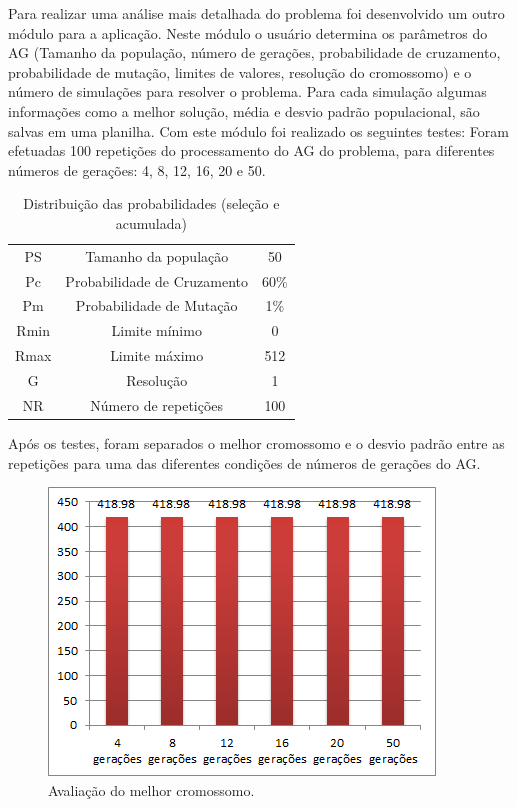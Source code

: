 \documentclass[twoside]{article}
\begin{document}
\begin{multicols}{2}
Para realizar uma análise mais detalhada do problema foi desenvolvido um outro módulo para a aplicação. Neste módulo o usuário determina os parâmetros do AG (Tamanho da população, número de gerações, probabilidade de cruzamento, probabilidade de mutação, limites de valores, resolução do cromossomo) e  o número de simulações para resolver o problema. Para cada simulação algumas informações como a melhor solução, média e desvio padrão populacional, são salvas em uma planilha. Com este módulo foi realizado os seguintes testes: Foram efetuadas 100 repetições do processamento do AG do problema, para diferentes números de gerações: 4, 8, 12, 16, 20 e 50.

\begin{table}[H]
\label{tab:popinfo}
\caption{Distribuição das probabilidades (seleção e acumulada)}
\centering
\begin{tabular}{ccc}
\toprule
PS & Tamanho da população & 50\\
Pc & Probabilidade de Cruzamento & 60\%\\
Pm & Probabilidade de Mutação & 1\%\\
Rmin & Limite mínimo & 0\\
Rmax & Limite máximo & 512\\
G & Resolução & 1\\
NR & Número de repetições & 100\\
\bottomrule
\end{tabular}
\end{table}

Após os testes, foram separados o melhor cromossomo e o desvio padrão entre as repetições para uma das diferentes condições de números de gerações do AG.

\begin{figure}[H]
\label{fig:t1}
  \caption{Avaliação do melhor cromossomo.}
  \centering
    \includegraphics[scale = 0.7]{test_aval1.png}
\end{figure}


\end{multicols}
\end{document}
